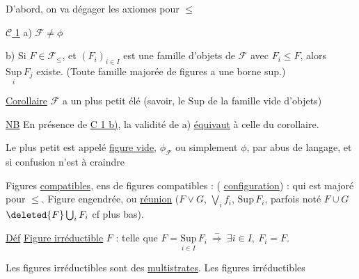 
D'abord, on va dégager les axiomes pour $\leq$

\uline{$\mathcal C$ 1} a) $\mathcal F\ne\phi$

 b) Si $F\in\mathcal F_{\leq}$, et $(F_i)_{i\in I}$ est une famille d'objets de $\mathcal F$ avec $F_i\leq F$, alors $\underset{i}{\mathrm{Sup}}\,F_j$ existe. (Toute famille majorée de figures a une borne sup.)

\uline{Corollaire} $\mathcal F$ a un plus petit élé (savoir, le $\mathrm{Sup}$ de la famille vide d'objets)

\uline{NB} En présence de  \uline{C 1 b)}, la validité de a) \uline{équivaut} à celle du corollaire.

Le plus petit  est appelé \uline{figure vide},  $\phi_{\mathcal F}$ ou simplement $\phi$, par abus de langage, et si confusion n'est à craindre


Figures \uline{compatibles}, ens de figures  compatibles :   ( \uline{configuration}) : qui est majoré pour $\leq$.  Figure engendrée, ou \uline{réunion} ($F\vee G$, $\bigvee_i f_i$, $\mathrm{Sup}\,F_i$, parfois noté $F\cup G$  $\deleted{F}\bigcup_iF_i$ cf plus bas).

\uline{Déf} \uline{Figure irréductible} $F$ : telle que $\displaystyle F=\underset{i\in I}{\mathrm{Sup}}\,F_i\ \overset{-}{\Longrightarrow}\ \exists i\in I,\ F_i=F$.

 Les figures irréductibles sont  des \uline{multistrates}.  Les figures irréductibles
